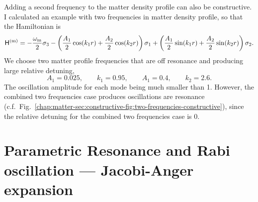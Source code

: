Adding a second frequency to the matter density profile can also be constructive. I calculated an example with two frequencies in matter density profile, so that the Hamiltonian is
\begin{equation*}
    \mathsf H^{(\mathrm m)} = - \frac{\omega_{\mathrm m}}{2} \sigma_3 - \left(\frac{A_1}{2}\cos(k_1 r) + \frac{A_2}{2}\cos(k_2 r) \right) \sigma_1 + \left( \frac{A_1}{2}\sin(k_1 r) + \frac{A_2}{2}\sin(k_2 r) \right) \sigma_2.
\end{equation*}
We choose two matter profile frequencies that are off resonance and producing large relative detuning,
\begin{equation}
    A_1 = 0.025, \qquad k_1 = 0.95, \qquad A_1 = 0.4, \qquad k_2 = 2.6.
\end{equation}
The oscillation amplitude for each mode being much smaller than 1. However, the combined two frequencies case produces oscillations are resonance (c.f.~Fig.~\ref{chap:matter-sec:constructive-fig:two-frequencies-constructive}), since the relative detuning for the combined two frequencies case is 0.




\section{\label{sec:jacobi}Parametric Resonance and Rabi oscillation --- Jacobi-Anger expansion}


